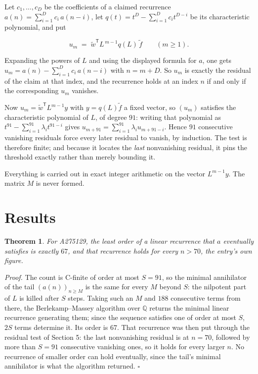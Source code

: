 \documentclass[11pt]{article}
\newtheorem{theorem}{Theorem}
\theoremstyle{definition}
\begin{document}
Let $c_1,\dots,c_D$ be the coefficients of a claimed recurrence $a(n) = \sum_{i=1}^{D} c_i\,a(n-i)$, let $q(t) = t^{D} - \sum_{i=1}^{D} c_i t^{D-i}$ be its characteristic polynomial, and put

\[u_m \;=\; \tilde w^{\mathsf T} L^{\,m-1} q(L)\,\tilde f \qquad (m \ge 1).\]

Expanding the powers of $L$ and using the displayed formula for $a$, one gets $u_m = a(n) - \sum_{i=1}^{D} c_i\,a(n-i)$ with $n = m + D$. So $u_m$ is exactly the residual of the claim at that index, and the recurrence holds at an index $n$ if and only if the corresponding $u_m$ vanishes.

Now $u_m = \tilde w^{\mathsf T} L^{m-1} y$ with $y = q(L)\tilde f$ a fixed vector, so $(u_m)$ satisfies the characteristic polynomial of $L$, of degree $91$: writing that polynomial as $t^{91} - \sum_{i=1}^{91} \lambda_i t^{91-i}$ gives $u_{m+91} = \sum_{i=1}^{91} \lambda_i u_{m+91-i}$. Hence $91$ consecutive vanishing residuals force every later residual to vanish, by induction. The test is therefore finite; and because it locates the {\itshape last} nonvanishing residual, it pins the threshold exactly rather than merely bounding it.

Everything is carried out in exact integer arithmetic on the vector $L^{m-1}y$. The matrix $M$ is never formed.

\section{Results}

\begin{theorem} For A275129, the least order of a linear recurrence that $a$ eventually satisfies is exactly $67$, and that recurrence holds for every $n > 70$, the entry's own figure.\end{theorem}

{\itshape Proof.} The count is C-finite of order at most $S = 91$, so the minimal annihilator of the tail $(a(n))_{n \ge M}$ is the same for every $M$ beyond $S$: the nilpotent part of $L$ is killed after $S$ steps. Taking such an $M$ and $188$ consecutive terms from there, the Berlekamp--Massey algorithm over $\mathbb{Q}$ returns the minimal linear recurrence generating them; since the sequence satisfies one of order at most $S$, $2S$ terms determine it. Its order is $67$. That recurrence was then put through the residual test of Section 5: the last nonvanishing residual is at $n = 70$, followed by more than $S = 91$ consecutive vanishing ones, so it holds for every larger $n$. No recurrence of smaller order can hold eventually, since the tail's minimal annihilator is what the algorithm returned. $\square$
\end{document}
